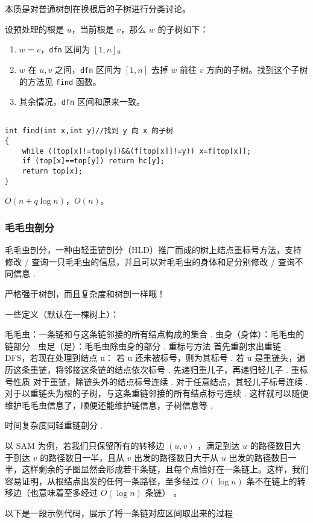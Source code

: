 \documentclass[12pt]{ctexart}
\begin{document}
本质是对普通树剖在换根后的子树进行分类讨论。

设预处理的根是 $u$，当前根是 $v$，那么 $w$ 的子树如下：

\begin{enumerate}
	\item $w=v$，\verb|dfn| 区间为 $[1,n]$。
	\item $w$ 在 $u,v$ 之间，\verb|dfn| 区间为 $[1,n]$ 去掉 $w$ 前往 $v$ 方向的子树。找到这个子树的方法见 \verb|find| 函数。
	\item 其余情况，\verb|dfn| 区间和原来一致。
\end{enumerate}

\begin{lstlisting}

int find(int x,int y)//找到 y 向 x 的子树
{
	while ((top[x]!=top[y])&&(f[top[x]]!=y)) x=f[top[x]];
	if (top[x]==top[y]) return hc[y];
	return top[x];
}
\end{lstlisting}
$O(n+q\log n)$，$O(n)$。



\subsubsection{毛毛虫剖分}
毛毛虫剖分，一种由轻重链剖分（HLD）推广而成的树上结点重标号方法，支持修改 / 查询一只毛毛虫的信息，并且可以对毛毛虫的身体和足分别修改 / 查询不同信息 .

严格强于树剖，而且复杂度和树剖一样哦！

一些定义（默认在一棵树上）：

毛毛虫：一条链和与这条链邻接的所有结点构成的集合 .
虫身（身体）：毛毛虫的链部分 .
虫足（足）：毛毛虫除虫身的部分 .
重标号方法
首先重剖求出重链 .
DFS，若现在处理到结点 u：
若 u 还未被标号，则为其标号 .
若 u 是重链头，遍历这条重链，将邻接这条链的结点依次标号 .
先递归重儿子，再递归轻儿子 .
重标号性质
对于重链，除链头外的结点标号连续 .
对于任意结点，其轻儿子标号连续 .
对于以重链头为根的子树，与这条重链邻接的所有结点标号连续 .
这样就可以随便维护毛毛虫信息了，顺便还能维护链信息，子树信息等 .

时间复杂度同轻重链剖分 .

以 SAM 为例，若我们只保留所有的转移边 $(u,v)$ ，满足到达 $u$ 的路径数目大于到达 $v$ 的路径数目一半，且从 $v$ 出发的路径数目大于从 $u$ 出发的路径数目一半，这样剩余的子图显然会形成若干条链，且每个点恰好在一条链上。这样，我们容易证明，从根结点出发的任何一条路径，至多经过 $O(\log n)$ 条不在链上的转移边（也意味着至多经过 $O(\log n)$ 条链） 。

以下是一段示例代码，展示了将一条链对应区间取出来的过程
\end{document}
